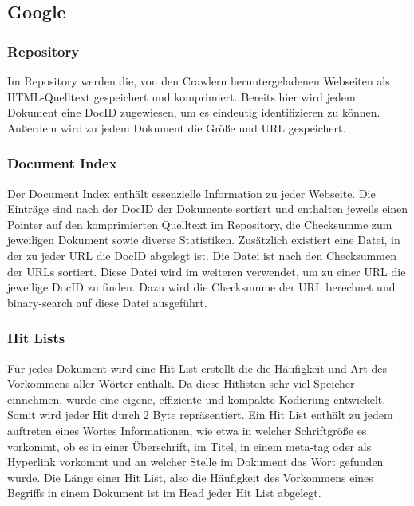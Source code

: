 \documentclass[12pt, a4paper]{llncs}
\begin{document}
	\subsection{Google}
	
	
	\subsubsection{Repository}
	Im Repository werden die, von den Crawlern heruntergeladenen Webseiten als HTML-Quelltext gespeichert und komprimiert. Bereits hier wird jedem Dokument
	eine DocID zugewiesen, um es eindeutig identifizieren zu können. Außerdem wird zu jedem Dokument die Größe und URL gespeichert.\cite{page98}

	\subsubsection{Document Index}
	Der Document Index enthält essenzielle Information zu jeder Webseite. Die Einträge sind nach der DocID der Dokumente sortiert und enthalten jeweils einen
	Pointer auf den komprimierten Quelltext im Repository, die Checksumme zum jeweiligen Dokument sowie diverse Statistiken. Zusätzlich existiert eine Datei, in
	der zu jeder URL die DocID abgelegt ist. Die Datei ist nach den Checksummen der URLs sortiert. Diese Datei wird im weiteren verwendet, um zu einer URL die
	jeweilige DocID zu finden. Dazu wird die Checksumme der URL berechnet und binary-search auf diese Datei ausgeführt.\cite{page98}
	
	\subsubsection{Hit Lists}
	Für jedes Dokument wird eine Hit List erstellt die die Häufigkeit und Art des Vorkommens aller Wörter enthält. Da diese Hitlisten sehr viel Speicher einnehmen,
	wurde eine eigene, effiziente und kompakte Kodierung entwickelt. Somit wird jeder Hit durch 2 Byte repräsentiert. Ein Hit List enthält zu jedem auftreten eines Wortes
	Informationen, wie etwa in welcher Schriftgröße es vorkommt, ob es in einer Überschrift, im Titel, in einem meta-tag oder als Hyperlink vorkommt und an welcher Stelle
	im Dokument das Wort gefunden wurde. Die Länge einer Hit List, also die Häufigkeit des Vorkommens eines Begriffs in einem Dokument ist im Head jeder Hit List abgelegt.\cite{page98}
	
\end{document}
